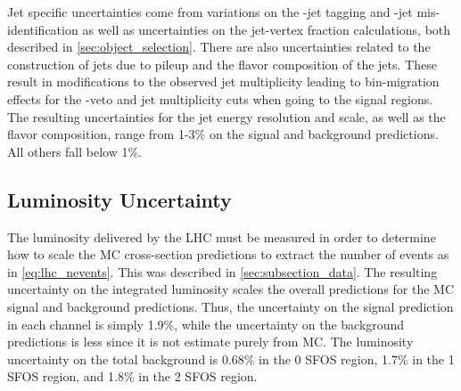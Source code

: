 Jet specific uncertainties come from variations on the \bee-jet tagging
and \bee-jet mis-identification as well as uncertainties on the jet-vertex
fraction calculations, both described in \sec\ref{sec:object_selection}. There
are also uncertainties related to the construction of jets due to pileup
and the flavor composition of the jets. These result in modifications
to the observed jet multiplicity leading to bin-migration effects 
for the \bee-veto and jet multiplicity cuts when going to the signal regions.
The resulting uncertainties for the jet energy resolution and scale, as well
as the flavor composition, range from 1-3\% on the signal and background 
predictions. All others fall below 1\%.



\subsection{Luminosity Uncertainty}
The luminosity delivered by the LHC must be measured in order to determine
how to scale the MC cross-section
predictions to extract the number of events as in \eqn\eqref{eq:lhc_nevents}.
This was described in \sec\ref{sec:subsection_data}. The resulting
uncertainty on the integrated luminosity scales the overall predictions
for the MC signal and background predictions. Thus, the uncertainty 
on the signal prediction in each channel is simply 1.9\%, while the uncertainty
on the background predictions is less since it is not estimate purely from 
MC. The luminosity uncertainty on the total background is
0.68\% in the 0 SFOS region, 1.7\% in the 1 SFOS region, 
and 1.8\% in the 2 SFOS region.
